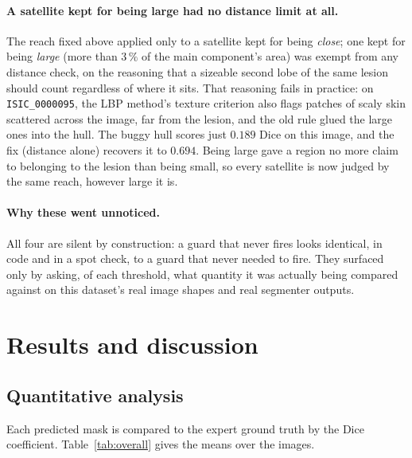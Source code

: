 \documentclass[11pt,a4paper]{article}
\begin{document}
\paragraph{A satellite kept for being large had no distance limit at all.}
The reach fixed above applied only to a satellite kept for being
\emph{close}; one kept for being \emph{large} (more than $3\,\%$ of the main
component's area) was exempt from any distance check, on the reasoning that a
sizeable second lobe of the same lesion should count regardless of where it
sits. That reasoning fails in practice: on \texttt{ISIC\_0000095}, the LBP
method's texture criterion also flags patches of scaly skin scattered across
the image, far from the lesion, and the old rule glued the large ones into the
hull. The buggy hull scores just $0.189$ Dice on this image, and the fix
(distance alone) recovers it to $0.694$. Being large gave a region no more
claim to belonging to the lesion than being small, so every satellite is now
judged by the same reach, however large it is.

\paragraph{Why these went unnoticed.} All four are silent by construction: a
guard that never fires looks identical, in code and in a spot check, to a
guard that never needed to fire. They surfaced only by asking, of each
threshold, what quantity it was actually being compared against on this
dataset's real image shapes and real segmenter outputs.

\section{Results and discussion}
\label{sec:results}

\subsection{Quantitative analysis}

Each predicted mask is compared to the expert ground truth by the Dice
coefficient. Table~\ref{tab:overall} gives the means over the \nimages{} images.
\end{document}
